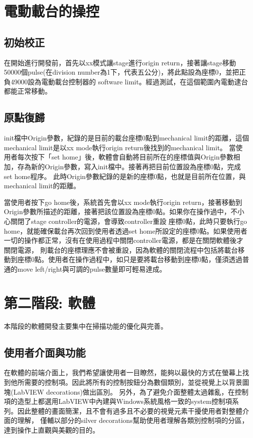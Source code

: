 \documentclass[12pt]{article}
\begin{document}
    \section{電動載台的操控}
    \subsection{初始校正}
    在開始進行開發前，首先以xx模式讓stage進行origin return，接著讓stage移動50000個pulse(在division number為1下，代表五公分)，將此點設為座標0，並把正負49000設為電動載台控制器的
    software limit。經過測試，在這個範圍內電動逮台都能正常移動。
    \subsection{原點復歸}
    init檔中Origin參數，紀錄的是目前的載台座標0點到mechanical limit的距離，這個mechanical limit是以xx mode執行origin return後找到的mechanical limit。
    當使用者每次按下「set home」後，軟體會自動將目前所在的座標值與Origin參數相加，存為新的Origin參數，寫入init檔中。接著再把目前位置設為座標0點，完成set home程序。
    此時Origin參數紀錄的是新的座標0點，也就是目前所在位置，與mechanical limit的距離。

    當使用者按下go home後，系統首先會以xx mode執行origin return，接著移動到Origin參數所描述的距離，接著把該位置設為座標0點。如果你在操作過中，不小心關閉了stage controller的電源，會導致controller重設
    座標0點，此時只要執行go home，就能確保載台再次回到使用者透過set home所設定的座標0點。如果使用者一切的操作都正常，沒有在使用過程中關閉controller電源，都是在關閉軟體後才關閉電源，
    則載台的座標理應不會被重設，因為軟體的關閉流程中包括將載台移動到座標0點。使用者在操作過程中，如只是要將載台移動到座標0點，僅須透過普通的move left/right與可調的pulse數量即可輕易達成。
    \section{第二階段: 軟體}
    本階段的軟體開發主要集中在掃描功能的優化與完善。
    \subsection{使用者介面與功能}
    在軟體的前端介面上，我們希望讓使用者一目瞭然，能夠以最快的方式在螢幕上找到他所需要的控制項。因此將所有的控制按鈕分為數個類別，並從視覺上以背景圖塊(LabVIEW decorations)做出區別。
    另外，為了避免介面整體太過雜亂，在控制項的造型上都選用LabVIEW中內建與Windows系統風格一致的system控制項系列。因此整體的畫面簡潔，且不會有過多且不必要的視覺元素干擾使用者對整體介面的理解，
    僅輔以部分的silver decorations幫助使用者理解各類別控制項的分區，達到操作上直觀與美觀的目的。
\end{document}
